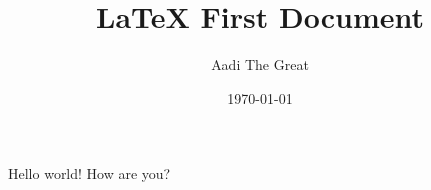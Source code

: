 \documentclass{article}
\title{LaTeX First Document}
\author{Aadi The Great}
\date{\today}
\begin{document}
\maketitle
Hello world!
How are you?
\end{document}
